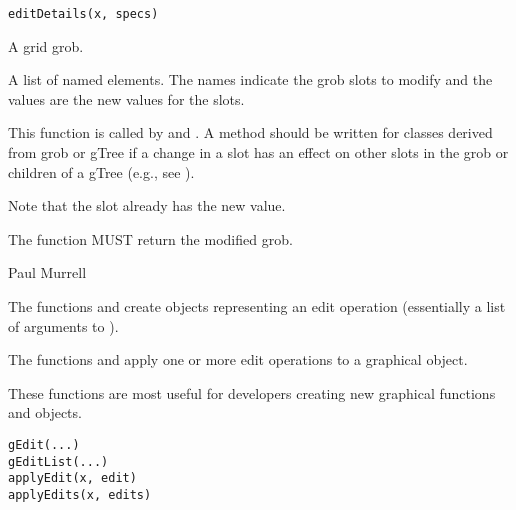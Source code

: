 %
\begin{Usage}
\begin{verbatim}
editDetails(x, specs)
\end{verbatim}
\end{Usage}
%
\begin{Arguments}
\begin{ldescription}
\item[\code{x}]  A grid grob. 
\item[\code{specs}]  A list of named elements.  The names indicate the
grob slots to modify and the values are the new values for the slots. 
\end{ldescription}
\end{Arguments}
%
\begin{Details}\relax
This function is called by  and .
A method should be written for classes derived from grob or gTree
if a change in a slot has an effect on other slots in the grob or
children of a gTree (e.g., see ).

Note that the slot already has the new value.
\end{Details}
%
\begin{Value}
The function MUST return the modified grob.
\end{Value}
%
\begin{Author}\relax
 Paul Murrell 
\end{Author}
%
\begin{SeeAlso}\relax
\end{SeeAlso}
%
\begin{Description}\relax
The functions  and  create
objects representing an edit operation (essentially a list
of arguments to ).

The functions  and  apply
one or more edit operations to a graphical object.

These functions are most useful for developers creating new
graphical functions and objects.
\end{Description}
%
\begin{Usage}
\begin{verbatim}
gEdit(...)
gEditList(...)
applyEdit(x, edit)
applyEdits(x, edits)
\end{verbatim}
\end{Usage}
